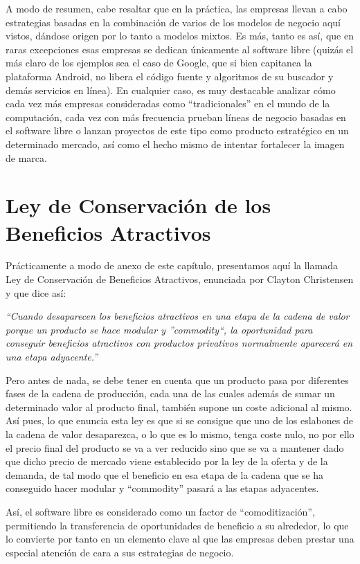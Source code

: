 A modo de resumen, cabe resaltar que en la práctica, las empresas llevan a cabo
estrategias basadas en la combinación de varios de los modelos de negocio aquí
vistos, dándose origen por lo tanto a modelos mixtos. Es más, tanto es así, que
en raras excepciones esas empresas se dedican únicamente al software libre
(quizás el más claro de los ejemplos sea el caso de Google, que si bien
capitanea la plataforma Android, no libera el código fuente y algoritmos de su
buscador y demás servicios en línea). En cualquier caso, es muy destacable
analizar cómo cada vez más empresas consideradas como ``tradicionales'' en el
mundo de la computación, cada vez con más frecuencia prueban líneas de negocio
basadas en el software libre o lanzan proyectos de este tipo como producto
estratégico en un determinado mercado, así como el hecho mismo de intentar
fortalecer la imagen de marca.

\section{Ley de Conservación de los Beneficios Atractivos}

Prácticamente a modo de anexo de este capítulo, presentamos aquí la llamada Ley
de Conservación de Beneficios Atractivos, enunciada por Clayton Christensen y
que dice así:

\textit{``Cuando desaparecen los beneficios atractivos en una etapa de la cadena
de valor porque un producto se hace modular y ''commodity``, la oportunidad para
conseguir beneficios atractivos con productos privativos normalmente aparecerá
en una etapa adyacente.''}

Pero antes de nada, se debe tener en cuenta que un producto pasa por diferentes
fases de la cadena de producción, cada una de las cuales además de sumar un
determinado valor al producto final, también supone un coste adicional al
mismo. Así pues, lo que enuncia esta ley es que si se consigue que uno de los
eslabones de la cadena de valor desaparezca, o lo que es lo mismo, tenga
coste nulo, no por ello el precio final del producto se va a ver reducido sino
que se va a mantener dado que dicho precio de mercado viene establecido por la
ley de la oferta y de la demanda, de tal modo que el beneficio en esa etapa de
la cadena que se ha conseguido hacer modular y ``commodity'' pasará a las etapas
adyacentes.

Así, el software libre es considerado como un factor de ``comoditización'',
permitiendo la transferencia de oportunidades de beneficio a su alrededor, lo
que lo convierte por tanto en un elemento clave al que las empresas deben
prestar una especial atención de cara a sus estrategias de negocio.

